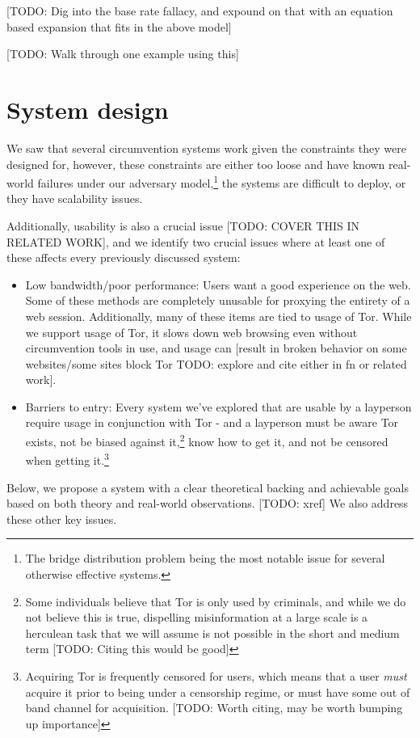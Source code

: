 \documentclass[12pt]{report}
\begin{document}
[TODO: Dig into the base rate fallacy, and expound on that with an equation based expansion that fits in the above model]

[TODO: Walk through one example using this]

\chapter{System design}

We saw that several circumvention systems work given the constraints they were designed for, however, these constraints are either too loose and have known real-world failures under our adversary model,\footnote{The bridge distribution problem being the most notable issue for several otherwise effective systems.} the systems are difficult to deploy, or they have scalability issues.

Additionally, usability is also a crucial issue [TODO: COVER THIS IN RELATED WORK], and we identify two crucial issues where at least one of these affects every previously discussed system:
\begin{itemize}
  \item Low bandwidth/poor performance: Users want a good experience on the web. Some of these methods are completely unusable for proxying the entirety of a web session. Additionally, many of these items are tied to usage of Tor. While we support usage of Tor, it slows down web browsing even without circumvention tools in use, and usage can [result in broken behavior on some websites/some sites block Tor TODO: explore and cite either in fn or related work].
  \item Barriers to entry: Every system we've explored that are usable by a layperson require usage in conjunction with Tor - and a layperson must be aware Tor exists, not be biased against it,\footnote{Some individuals believe that Tor is only used by criminals, and while we do not believe this is true, dispelling misinformation at a large scale is a herculean task that we will assume is not possible in the short and medium term [TODO: Citing this would be good]} know how to get it, and not be censored when getting it.\footnote{Acquiring Tor is frequently censored for users, which means that a user \emph{must} acquire it prior to being under a censorship regime, or must have some out of band channel for acquisition. [TODO: Worth citing, may be worth bumping up importance]}
\end{itemize}

Below, we propose a system with a clear theoretical backing and achievable goals based on both theory and real-world observations. [TODO: xref] We also address these other key issues.
\end{document}
